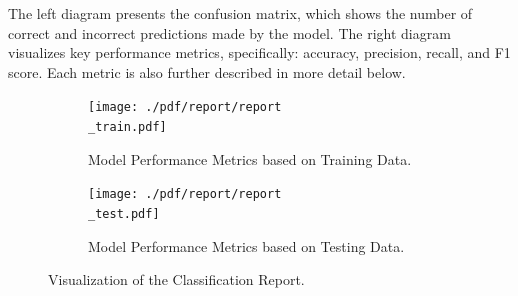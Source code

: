 The left diagram presents the confusion matrix, which shows the number of correct and incorrect predictions made by the model.
The right diagram visualizes key performance metrics, specifically: accuracy, precision, recall, and F1 score. Each metric is also further described in  more detail below.
\begin{figure}[H]
    \centering

    \begin{subfigure}[b]{\textwidth}
        \begin{adjustbox}{max width=0.8\textwidth,center}
            \texttt{[image: ./pdf/report/report\\\_train.pdf]}
        \end{adjustbox}
        \caption{Model Performance Metrics based on Training Data.}
        \label{fig:train_perf}
    \end{subfigure}

    \bigskip %

    \begin{subfigure}[b]{\textwidth}
        \begin{adjustbox}{max width=0.8\textwidth,center}
            \texttt{[image: ./pdf/report/report\\\_test.pdf]}
        \end{adjustbox}
        \caption{Model Performance Metrics based on Testing Data.}
        \label{fig:test_perf}
    \end{subfigure}

    \caption{Visualization of the Classification Report.}
    \label{fig:conf_matrix}
\end{figure}


